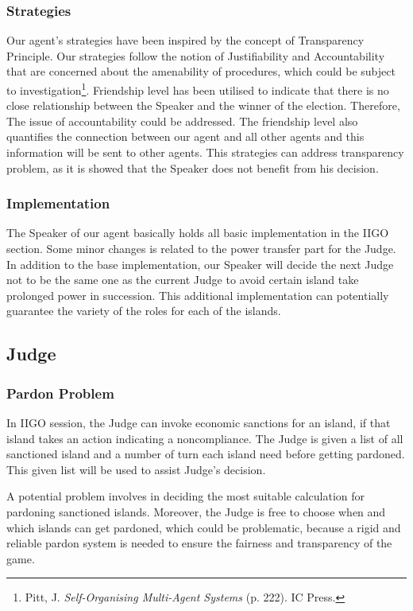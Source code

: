 \subsubsection{Strategies} \label{subsubsec:Team6_Speaker:Strategies}
Our agent's strategies have been inspired by the concept of Transparency Principle. Our strategies follow the notion of Justifiability and Accountability that are concerned about the amenability of procedures, which could be subject to investigation\footnote{Pitt, J. \textit{Self-Organising Multi-Agent Systems} (p. 222). IC Press.}. Friendship level has been utilised to indicate that there is no close relationship between the Speaker and the winner of the election. Therefore, The issue of accountability could be addressed. The friendship level also quantifies the connection between our agent and all other agents and this information will be sent to other agents. This strategies can address transparency problem, as it is showed that the Speaker does not benefit from his decision.

\subsubsection{Implementation} \label{subsubsec:Team6_Speaker:Implementation}
The Speaker of our agent basically holds all basic implementation in the IIGO section. Some minor changes is related to the power transfer part for the Judge. In addition to the base implementation, our Speaker will decide the next Judge not to be the same one as the current Judge to avoid certain island take prolonged power in succession. This additional implementation can potentially guarantee the variety of the roles for each of the islands.

\subsection{Judge} \label{subsec:Team6_Judge}
\subsubsection{Pardon Problem} \label{subsubsec:Team6_Judge:Problem}
In IIGO session, the Judge can invoke economic sanctions for an island, if that island takes an action indicating a noncompliance. The Judge is given a list of all sanctioned island and a number of turn each island need before getting pardoned. This given list will be used to assist Judge's decision.

A potential problem involves in deciding the most suitable calculation for pardoning sanctioned islands. Moreover, the Judge is free to choose when and which islands can get pardoned, which could be problematic, because a rigid and reliable pardon system is needed to ensure the fairness and transparency of the game.


